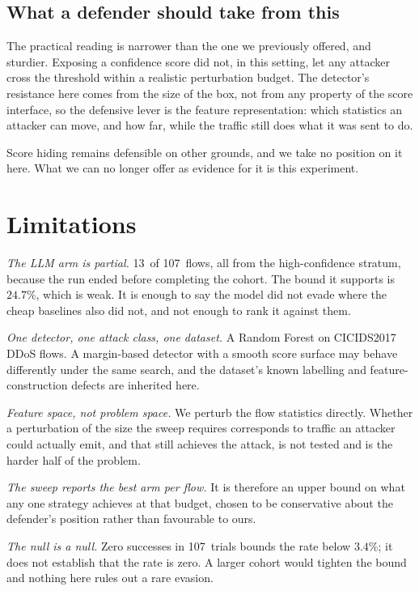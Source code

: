 \documentclass[journal]{IEEEtran}
\theoremstyle{definition}
\newcommand{\CN}{107}
\newcommand{\CCPhi}{3.4}
\newcommand{\CLlmN}{13}
\newcommand{\CLlmCPhi}{24.7}
\begin{document}
\subsection{What a defender should take from this}
The practical reading is narrower than the one we previously offered, and
sturdier. Exposing a confidence score did not, in this setting, let any attacker
cross the threshold within a realistic perturbation budget. The detector's
resistance here comes from the size of the box, not from any property of the
score interface, so the defensive lever is the feature representation: which
statistics an attacker can move, and how far, while the traffic still does what
it was sent to do.

Score hiding remains defensible on other grounds, and we take no position on it
here. What we can no longer offer as evidence for it is this experiment.

\section{Limitations}
\label{sec:limitations}

\emph{The LLM arm is partial.} \CLlmN\ of \CN\ flows, all from the
high-confidence stratum, because the run ended before completing the cohort.
The bound it supports is $\CLlmCPhi$\%, which is weak. It is enough to say the
model did not evade where the cheap baselines also did not, and not enough to
rank it against them.

\emph{One detector, one attack class, one dataset.} A Random Forest on
CICIDS2017 DDoS flows. A margin-based detector with a smooth score surface may
behave differently under the same search, and the dataset's known labelling and
feature-construction defects are inherited here.

\emph{Feature space, not problem space.} We perturb the flow statistics
directly. Whether a perturbation of the size the sweep requires corresponds to
traffic an attacker could actually emit, and that still achieves the attack, is
not tested and is the harder half of the problem.

\emph{The sweep reports the best arm per flow.} It is therefore an upper bound
on what any one strategy achieves at that budget, chosen to be conservative
about the defender's position rather than favourable to ours.

\emph{The null is a null.} Zero successes in \CN\ trials bounds the rate below
$\CCPhi$\%; it does not establish that the rate is zero. A larger cohort would
tighten the bound and nothing here rules out a rare evasion.
\end{document}
